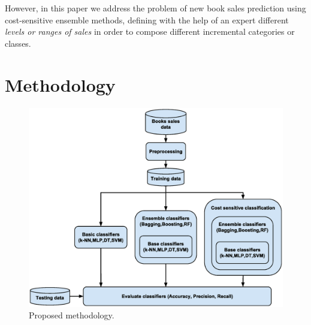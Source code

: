 \documentclass[a4paper,10pt,onecolumn,preprint,3p]{elsarticle}
\begin{document}
However, in this paper we address the problem of new book sales prediction using cost-sensitive ensemble methods, defining with the help of an expert different \textit{levels or ranges of sales} in order to compose different incremental categories or classes.


\section{Methodology}
\label{sec:methodology}

\begin{figure}[ht]
\begin{center}
\includegraphics[scale=0.40]{books_methodology}
\end{center}
\caption{Proposed methodology.}
\label{fig:methodology}
\end{figure}
\end{document}
